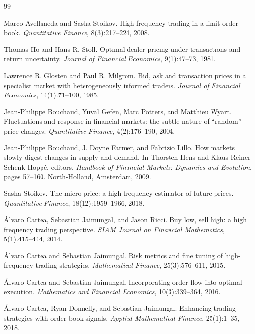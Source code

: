 \documentclass[11pt,a4paper]{article}
\theoremstyle{plain}
\theoremstyle{definition}
\begin{document}
\begingroup\small
\begin{thebibliography}{99}

Marco Avellaneda and Sasha Stoikov.
High-frequency trading in a limit order book.
\emph{Quantitative Finance}, 8(3):217--224, 2008.

Thomas Ho and Hans R. Stoll.
Optimal dealer pricing under transactions and return uncertainty.
\emph{Journal of Financial Economics}, 9(1):47--73, 1981.

Lawrence R. Glosten and Paul R. Milgrom.
Bid, ask and transaction prices in a specialist market with heterogeneously
informed traders.
\emph{Journal of Financial Economics}, 14(1):71--100, 1985.

Jean-Philippe Bouchaud, Yuval Gefen, Marc Potters, and Matthieu Wyart.
Fluctuations and response in financial markets: the subtle nature of
``random'' price changes.
\emph{Quantitative Finance}, 4(2):176--190, 2004.

Jean-Philippe Bouchaud, J. Doyne Farmer, and Fabrizio Lillo.
How markets slowly digest changes in supply and demand.
In Thorsten Hens and Klaus Reiner Schenk-Hopp\'e, editors,
\emph{Handbook of Financial Markets: Dynamics and Evolution}, pages 57--160.
North-Holland, Amsterdam, 2009.

Sasha Stoikov.
The micro-price: a high-frequency estimator of future prices.
\emph{Quantitative Finance}, 18(12):1959--1966, 2018.

\'Alvaro Cartea, Sebastian Jaimungal, and Jason Ricci.
Buy low, sell high: a high frequency trading perspective.
\emph{SIAM Journal on Financial Mathematics}, 5(1):415--444, 2014.

\'Alvaro Cartea and Sebastian Jaimungal.
Risk metrics and fine tuning of high-frequency trading strategies.
\emph{Mathematical Finance}, 25(3):576--611, 2015.

\'Alvaro Cartea and Sebastian Jaimungal.
Incorporating order-flow into optimal execution.
\emph{Mathematics and Financial Economics}, 10(3):339--364, 2016.

\'Alvaro Cartea, Ryan Donnelly, and Sebastian Jaimungal.
Enhancing trading strategies with order book signals.
\emph{Applied Mathematical Finance}, 25(1):1--35, 2018.


\end{thebibliography}
\end{document}
